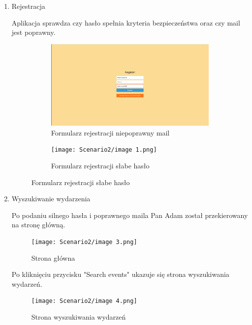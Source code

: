 \documentclass[11pt,a4paper]{article}
\begin{document}
\begin{enumerate}
    \item Rejestracja

    Aplikacja sprawdza czy hasło spełnia kryteria bezpieczeństwa oraz czy mail jest poprawny.

    \begin{figure}[H]
    \centering
    \captionsetup{justification=centering,margin=2cm}
        \begin{subfigure}{0.49\textwidth}
            \includegraphics[width=\textwidth]{Scenario2/image.png}
            \caption{Formularz rejestracji niepoprawny mail}
        \end{subfigure}
    \hfill
        \begin{subfigure}{0.49\textwidth}
            \texttt{[image: Scenario2/image 1.png]}
            \caption{Formularz rejestracji słabe hasło}
        \end{subfigure}
    \end{figure}

    \item Wyszukiwanie wydarzenia

    Po podaniu silnego hasła i poprawnego maila Pan Adam został przekierowany na stronę główną.

    \begin{figure} [H]
    \centering
    \texttt{[image: Scenario2/image 3.png]}
    \caption{Strona główna}
    \end{figure}

    Po kliknięciu przycisku "Search events" ukazuje się strona wyszukiwania wydarzeń.

    \begin{figure} [H]
    \centering
    \texttt{[image: Scenario2/image 4.png]}
    \caption{Strona wyszukiwania wydarzeń}
    \end{figure}


\end{enumerate}
\end{document}
